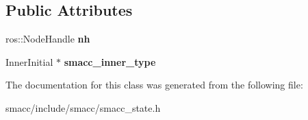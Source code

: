 \subsection*{Public Attributes}
\begin{DoxyCompactItemize}
\item 
\hypertarget{classsmacc_1_1SmaccState_a5e0564f2114c6af88a4a8ed6bba97f40}{ros\-::\-Node\-Handle {\bfseries nh}}\label{classsmacc_1_1SmaccState_a5e0564f2114c6af88a4a8ed6bba97f40}

\item 
\hypertarget{classsmacc_1_1SmaccState_a087d0f66729b98614feb8c59ea548af1}{Inner\-Initial $\ast$ {\bfseries smacc\-\_\-inner\-\_\-type}}\label{classsmacc_1_1SmaccState_a087d0f66729b98614feb8c59ea548af1}

\end{DoxyCompactItemize}


The documentation for this class was generated from the following file\-:\begin{DoxyCompactItemize}
\item 
smacc/include/smacc/smacc\-\_\-state.\-h\end{DoxyCompactItemize}

